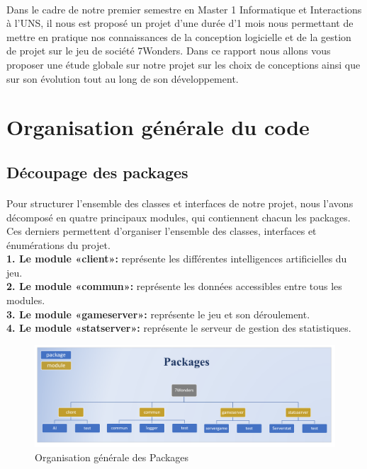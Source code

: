 \documentclass[13pt ,a4paper ]{report}
\begin{document}
\begin{multicols}{2} 
	\paragraph{}
	Dans le cadre de notre premier semestre en Master 1 Informatique et Interactions à l’UNS, il nous est proposé un projet d’une durée d’1 mois nous permettant de mettre en pratique nos connaissances de la conception logicielle et de la gestion de projet sur le jeu de société 7Wonders. 
\newline
Dans ce rapport nous allons vous proposer une étude globale sur notre projet sur les choix de conceptions ainsi que sur son évolution tout au long de son développement.
	
\section*{Organisation générale du code} 

	\subsection{Découpage des packages}
      \paragraph{}
      Pour structurer l’ensemble des classes et interfaces de notre projet, nous l’avons décomposé en quatre principaux modules, qui contiennent chacun les packages. Ces derniers permettent d’organiser l’ensemble des classes, interfaces et énumérations du projet.\\
 \textbf{  1. Le module «client»:} représente les différentes intelligences artificielles du jeu.\\
 \textbf{2. Le module «commun»:} représente les données accessibles entre tous les modules.\\
 \textbf{3. Le module «gameserver»:} représente le jeu et son déroulement.\\
 \textbf{4. Le module «statserver»:} représente le serveur de gestion des statistiques.
		\begin{figure}[H]
		\begin{center}
			\includegraphics[scale=0.205]{Paquetages.png}
			\caption{Organisation générale des Packages}
		\end{center}
		\end{figure}


\end{multicols}
\end{document}
